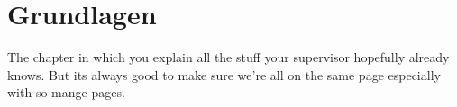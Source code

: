 \documentclass[thesis.tex]{subfiles}
\begin{document}
\chapter{Grundlagen}\label{chap:grundlagen}
The chapter in which you explain all the stuff your supervisor hopefully already knows. But its always good to make sure we're all on the same page especially with so mange pages.

\subfilebib %
\end{document}
